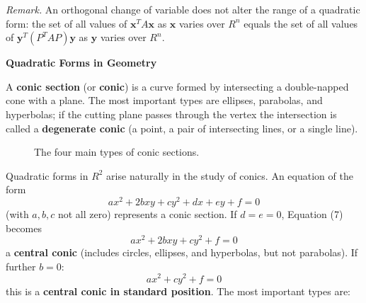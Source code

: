 \documentclass{article}
\newcommand{\redheading}[1]{{\vspace{2mm}\noindent\Large\bfseries\color{red!55!black} #1\par}\vspace{2mm}}
\begin{document}
\textit{Remark.} An orthogonal change of variable does not alter the range of a quadratic
form: the set of all values of $\mathbf{x}^T A\mathbf{x}$ as $\mathbf{x}$ varies over $R^n$
equals the set of all values of $\mathbf{y}^T(P^T AP)\mathbf{y}$ as $\mathbf{y}$ varies over
$R^n$.

\redheading{Quadratic Forms in Geometry}

A \textbf{conic section} (or \textbf{conic}) is a curve formed by intersecting a
double-napped cone with a plane. The most important types are ellipses, parabolas, and
hyperbolas; if the cutting plane passes through the vertex the intersection is called a
\textbf{degenerate conic} (a point, a pair of intersecting lines, or a single line).

\begin{figure}[ht]
\centering
{}
\caption{The four main types of conic sections.}
\label{fig:731}
\end{figure}

Quadratic forms in $R^2$ arise naturally in the study of conics. An equation of the form
\begin{equation}
  ax^2+2bxy+cy^2+dx+ey+f=0 \tag{7}
\end{equation}
(with $a,b,c$ not all zero) represents a conic section. If $d=e=0$, Equation (7) becomes
\begin{equation}
  ax^2+2bxy+cy^2+f=0 \tag{8}
\end{equation}
a \textbf{central conic} (includes circles, ellipses, and hyperbolas, but not parabolas). If
further $b=0$:
\begin{equation}
  ax^2+cy^2+f=0 \tag{9}
\end{equation}
this is a \textbf{central conic in standard position}. The most important types are:
\end{document}

